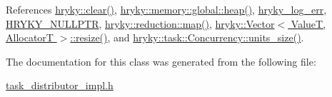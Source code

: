 References \hyperlink{namespacehryky_aa201297ea9530da954a7230be71cc19d}{hryky\-::clear()}, \hyperlink{namespacehryky_1_1memory_1_1global_a6fc6103f67c837aa0f39b359588409cd}{hryky\-::memory\-::global\-::heap()}, \hyperlink{log__writer__common_8h_ae5ad3dabb33f594695ef40753cb78aad}{hryky\-\_\-log\-\_\-err}, \hyperlink{common_8h_a4cd4ac09cfcdbd6b30ee69afc156e210}{H\-R\-Y\-K\-Y\-\_\-\-N\-U\-L\-L\-P\-T\-R}, \hyperlink{namespacehryky_1_1reduction_ac5eae270cf8047b294dc4ff3e5e11a79}{hryky\-::reduction\-::map()}, \hyperlink{classhryky_1_1_vector_a9148eb8972b43ed3a7e807d19be848a5}{hryky\-::\-Vector$<$ Value\-T, Allocator\-T $>$\-::resize()}, and \hyperlink{classhryky_1_1task_1_1_concurrency_a2def26af9d687f558bbdb77f8c59f142}{hryky\-::task\-::\-Concurrency\-::units\-\_\-size()}.



The documentation for this class was generated from the following file\-:\begin{DoxyCompactItemize}
\item 
\hyperlink{task__distributor__impl_8h}{task\-\_\-distributor\-\_\-impl.\-h}\end{DoxyCompactItemize}

